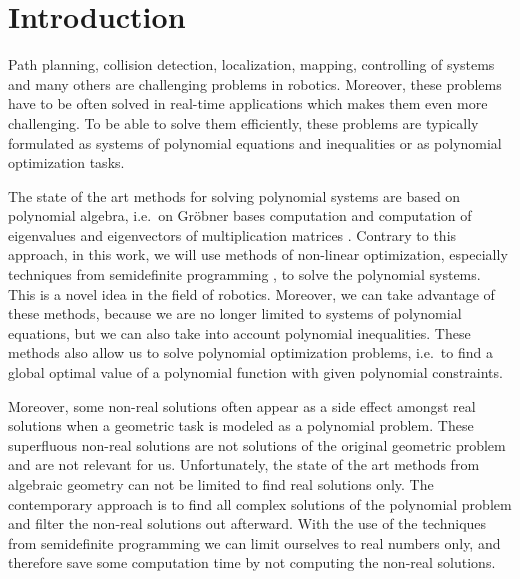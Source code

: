 \chapter{Introduction}
Path planning, collision detection, localization, mapping, controlling of systems and many others are challenging problems in robotics.
Moreover, these problems have to be often solved in real-time applications which makes them even more challenging.
To be able to solve them efficiently, these problems are typically formulated as systems of polynomial equations and inequalities or as polynomial optimization tasks.

The state of the art methods for solving polynomial systems are based on polynomial algebra, i.e.\ on Gr\"obner bases computation and computation of eigenvalues and eigenvectors of multiplication matrices \cite{Cox-Little-Shea2015}.
Contrary to this approach, in this work, we will use methods of non-linear optimization, especially techniques from semidefinite programming \cite{Lasserre}, to solve the polynomial systems.
This is a novel idea in the field of robotics.
Moreover, we can take advantage of these methods, because we are no longer limited to systems of polynomial equations, but we can also take into account polynomial inequalities.
These methods also allow us to solve polynomial optimization problems, i.e.\ to find a global optimal value of a polynomial function with given polynomial constraints.

Moreover, some non-real solutions often appear as a side effect amongst real solutions when a geometric task is modeled as a polynomial problem.
These superfluous non-real solutions are not solutions of the original geometric problem and are not relevant for us.
Unfortunately, the state of the art methods from algebraic geometry can not be limited to find real solutions only.
The contemporary approach is to find all complex solutions of the polynomial problem and filter the non-real solutions out afterward.
With the use of the techniques from semidefinite programming \cite{Laurent2012} we can limit ourselves to real numbers only, and therefore save some computation time by not computing the non-real solutions.
